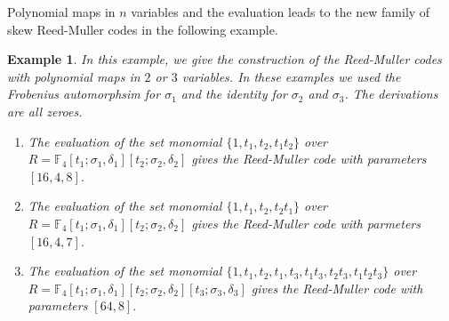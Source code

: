 \documentclass{amsproc}
\newcommand{\de}{\delta}
\newcommand{\si}{\sigma}
\newtheorem{example}[theorem]{Example}
\numberwithin{equation}{section}
\begin{document}
Polynomial maps in $n$ variables and  the evaluation leads to the new family of skew Reed-Muller codes in the following example.
\begin{example}
	In this example, we give the construction of the Reed-Muller codes with polynomial maps in $2$ or $3$ variables.  In these examples we used the Frobenius automorphsim for $\si_1$ and the identity for $\sigma_2$ and $\sigma_3$.  The derivations are all zeroes. 
	\begin{enumerate}
		\item The evaluation of the set monomial $\{1,t_1,t_2,t_1t_2\}$ over $R=\mathbb{F}_4[t_1;\si_1,\de_1][t_2;\si_2,\de_2]$ gives the Reed-Muller code with parameters $[16,4,8].$
		\item The evaluation of the set monomial $\{1,t_1,t_2,t_2t_1\}$ over $R=\mathbb{F}_4[t_1;\si_1,\de_1][t_2;\si_2,\de_2]$ gives the Reed-Muller code with parmeters $[16,4,7].$
		\item The evaluation of the set monomial $\{1,t_1,t_2,t_1,t_3,t_1t_3,t_2t_3,t_1t_2t_3\}$ over $R=\mathbb{F}_4[t_1;\si_1,\de_1][t_2;\si_2,\de_2][t_3;\si_3,\de_3]$ gives the Reed-Muller code with parameters $[64,8].$
	\end{enumerate}	
\end{example}
\end{document}
